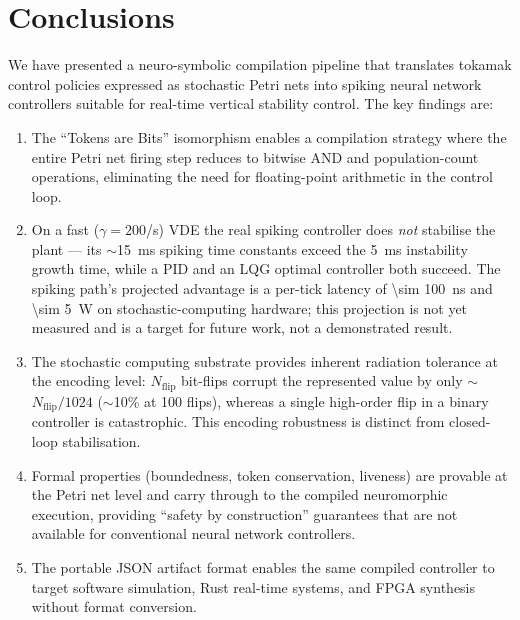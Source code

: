 \documentclass[12pt]{article}
\begin{document}
\section{Conclusions}
\label{sec:conclusions}

We have presented a neuro-symbolic compilation pipeline that translates
tokamak control policies expressed as stochastic Petri nets into spiking
neural network controllers suitable for real-time vertical stability
control.  The key findings are:

\begin{enumerate}
  \item The ``Tokens are Bits'' isomorphism enables a compilation
    strategy where the entire Petri net firing step reduces to bitwise
    AND and population-count operations, eliminating the need for
    floating-point arithmetic in the control loop.

  \item On a fast ($\gamma = 200$/s) VDE the real spiking controller does
    \emph{not} stabilise the plant --- its $\sim$\SI{15}{\milli\second} spiking
    time constants exceed the \SI{5}{\milli\second} instability growth time,
    while a PID and an LQG optimal controller both succeed.  The spiking path's
    projected advantage is a per-tick latency of \SI{\sim 100}{\nano\second}
    and \SI{\sim 5}{\watt} on stochastic-computing hardware; this projection is
    not yet measured and is a target for future work, not a demonstrated result.

  \item The stochastic computing substrate provides inherent radiation
    tolerance at the encoding level: $N_{\mathrm{flip}}$ bit-flips corrupt the
    represented value by only $\sim$$N_{\mathrm{flip}}/1024$ ($\sim$10\% at 100
    flips), whereas a single high-order flip in a binary controller is
    catastrophic.  This encoding robustness is distinct from closed-loop
    stabilisation.

  \item Formal properties (boundedness, token conservation, liveness)
    are provable at the Petri net level and carry through to the
    compiled neuromorphic execution, providing ``safety by
    construction'' guarantees that are not available for conventional
    neural network controllers.

  \item The portable JSON artifact format enables the same compiled
    controller to target software simulation, Rust real-time systems,
    and FPGA synthesis without format conversion.
\end{enumerate}
\end{document}
